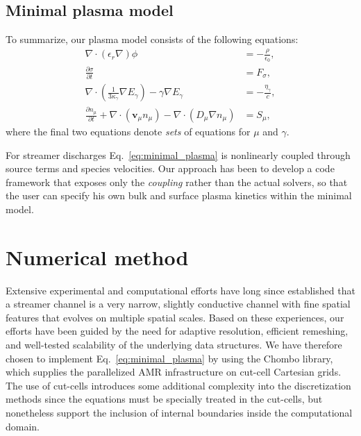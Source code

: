 \documentclass[3p]{elsarticle}
\begin{document}
\subsection{Minimal plasma model}
To summarize, our plasma model consists of the following equations: 
\begin{subequations}
  \label{eq:minimal_plasma}
  \begin{align}
    \nabla\cdot(\epsilon_r\nabla)\phi &= -\frac{\rho}{\epsilon_0}, \\
    \frac{\partial \sigma}{\partial t} &= F_\sigma, \\
    \nabla\cdot\left(\frac{1}{3\kappa_\gamma}\nabla E_\gamma\right) - \gamma\nabla E_{\gamma} &= -\frac{\eta_\gamma}{c}, \\
    \frac{\partial n_\mu}{\partial t} + \nabla\cdot\left(\bm{v}_\mu n_\mu\right) - \nabla\cdot\left(D_\mu\nabla n_\mu\right) &= S_\mu,
  \end{align}
\end{subequations}
where the final two equations denote \emph{sets} of equations for $\mu$ and $\gamma$.

For streamer discharges Eq.~\eqref{eq:minimal_plasma} is nonlinearly coupled through source terms and species velocities. Our approach has been to develop a code framework that exposes only the \emph{coupling} rather than the actual solvers, so that the user can specify his own bulk and surface plasma kinetics within the minimal model. 

\section{Numerical method}
\label{sec:method}
Extensive experimental and computational efforts have long since established that a streamer channel is a very narrow, slightly conductive channel with fine spatial features that evolves on multiple spatial scales. Based on these experiences, our efforts have been guided by the need for adaptive resolution, efficient remeshing, and well-tested scalability of the underlying data structures. We have therefore chosen to implement Eq.~\eqref{eq:minimal_plasma} by using the Chombo library, which supplies the parallelized AMR infrastructure on cut-cell Cartesian grids. The use of cut-cells introduces some additional complexity into the discretization methods since the equations must be specially treated in the cut-cells, but nonetheless support the inclusion of internal boundaries inside the computational domain.
\end{document}

